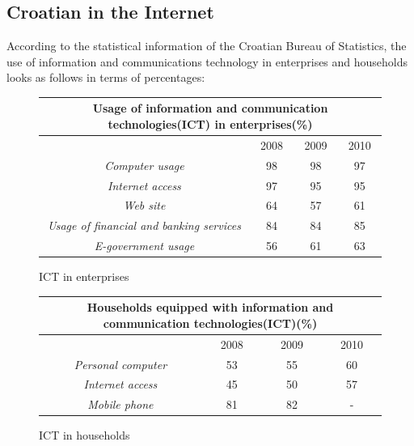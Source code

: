 \begin{multicols}{2}
\subsection{Croatian in the Internet}

According to the statistical information of the Croatian Bureau of Statistics, the use of information and communications technology in enterprises and households looks as follows in terms of percentages:

\begin{figure}[htb]
\centering
    \begin{tabular}{|c|c|c|c|}
        \hline
      \multicolumn{4}{|c|}{\textbf{Usage of information and communication technologies(ICT) in enterprises(\%)}} \\ \hline
        ~                                              & 2008 & 2009 & 2010 \\ \hline
        \emph{Computer usage}                        & 98   & 98   & 97   \\ \hline
        \emph{Internet access}                       & 97   & 95   & 95   \\ \hline
        \emph{Web site}                            & 64   & 57   & 61   \\ \hline
        \emph{Usage of financial and banking services} & 84   & 84   & 85   \\ \hline
        \emph{E-government usage}                 & 56   & 61   & 63   \\
        \hline
   \end{tabular}
  \caption{ICT in enterprises}
  \label{fig:IST_pod_en}
\end{figure}

\begin{figure}[htb]
\centering
	\begin{tabular}{|c|c|c|c|}
        \hline
      \multicolumn{4}{|c|}{\textbf{Households equipped with information and communication technologies(ICT)(\%)}} \\ \hline
        ~                                              & 2008 & 2009 & 2010 \\ \hline
        \emph{Personal computer}   & 53   & 55   & 60   \\ \hline
        \emph{Internet access} & 45   & 50   & 57   \\ \hline
        \emph{Mobile phone}   & 81   & 82   & -    \\
        \hline
   \end{tabular}
  \caption{ICT in households}
  \label{fig:IST_kuc_en}
\end{figure}


\end{multicols}
